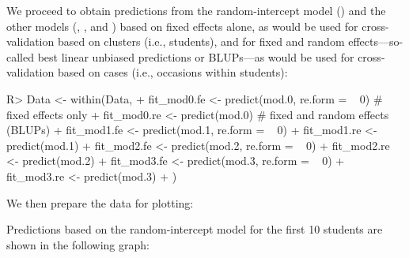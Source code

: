 \documentclass[
]{jss}
\begin{document}
We proceed to obtain predictions from the random-intercept model
() and the other models (, , and
) based on fixed effects alone, as would be used for
cross-validation based on clusters (i.e., students), and for fixed and
random effects---so-called best linear unbiased predictions or
BLUPs---as would be used for cross-validation based on cases (i.e.,
occasions within students):

\begin{CodeChunk}
\begin{CodeInput}
R> Data <- within(Data, {
+   fit_mod0.fe <- predict(mod.0, re.form = ~ 0) # fixed effects only
+   fit_mod0.re <- predict(mod.0) # fixed and random effects (BLUPs)
+   fit_mod1.fe <- predict(mod.1, re.form = ~ 0)
+   fit_mod1.re <- predict(mod.1)
+   fit_mod2.fe <- predict(mod.2, re.form = ~ 0)
+   fit_mod2.re <- predict(mod.2)
+   fit_mod3.fe <- predict(mod.3, re.form = ~ 0)
+   fit_mod3.re <- predict(mod.3)
+ })
\end{CodeInput}
\end{CodeChunk}

We then prepare the data for plotting:

\begin{CodeChunk}
\end{CodeChunk}

Predictions based on the random-intercept model  for the
first 10 students are shown in the following graph:
\end{document}
